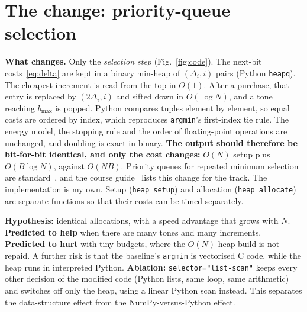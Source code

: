 \documentclass[10pt,a4paper]{article}
\begin{document}
\section{The change: priority-queue selection}
\textbf{What changes.} Only the \emph{selection step} (Fig.~\ref{fig:code}). The next-bit costs~\eqref{eq:delta} are kept in
a binary min-heap of $(\Delta_i,i)$ pairs (Python \texttt{heapq}). The cheapest increment is read from the top in $O(1)$. After a
purchase, that entry is replaced by $(2\Delta_i,i)$ and sifted down in $O(\log N)$, and a tone reaching $b_{\max}$ is popped.
Python compares tuples element by element, so equal costs are ordered by index, which reproduces \texttt{argmin}'s first-index
tie rule. The energy model, the stopping rule and the order of floating-point operations are unchanged, and doubling is exact
in binary. \textbf{The output should therefore be bit-for-bit identical, and only the cost changes:} $O(N)$ setup plus
$O(B\log N)$, against $\Theta(NB)$. Priority queues for repeated minimum selection are standard~\cite{clrs}, and the course
guide~\cite{guide} lists this change for the track. The implementation is my own. Setup (\texttt{heap\_setup}) and
allocation (\texttt{heap\_allocate}) are separate functions so that their costs can be timed separately.

\textbf{Hypothesis:} identical allocations, with a speed advantage that grows with $N$. \textbf{Predicted to help} when there are
many tones and many increments. \textbf{Predicted to hurt} with tiny budgets, where the $O(N)$ heap build is not repaid. A
further risk is that the baseline's \texttt{argmin} is vectorised C code, while the heap runs in interpreted Python.
\textbf{Ablation:} \texttt{selector="list-scan"} keeps every other decision of the modified code (Python lists, same loop,
same arithmetic) and switches off only the heap, using a linear Python scan instead. This separates the data-structure effect
from the NumPy-versus-Python effect.
\end{document}
